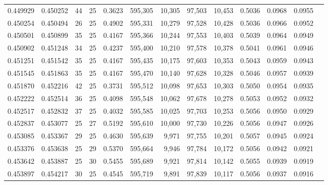 \begin{tabular}{rrrrrrrrrrrrr}
0.449929 & 0.450252 &    44 &  25 &                                     0.3623 & 595,305 &  10,305 &  97,503 &  10,453 & 0.5036 & 0.0968 & 0.0955 \\
0.450254 & 0.450494 &    26 &  25 &                                     0.4902 & 595,331 &  10,279 &  97,528 &  10,428 & 0.5036 & 0.0966 & 0.0952 \\
0.450501 & 0.450899 &    35 &  25 &                                     0.4167 & 595,366 &  10,244 &  97,553 &  10,403 & 0.5039 & 0.0964 & 0.0949 \\
0.450902 & 0.451248 &    34 &  25 &                                     0.4237 & 595,400 &  10,210 &  97,578 &  10,378 & 0.5041 & 0.0961 & 0.0946 \\
0.451251 & 0.451542 &    35 &  25 &                                     0.4167 & 595,435 &  10,175 &  97,603 &  10,353 & 0.5043 & 0.0959 & 0.0943 \\
0.451545 & 0.451863 &    35 &  25 &                                     0.4167 & 595,470 &  10,140 &  97,628 &  10,328 & 0.5046 & 0.0957 & 0.0939 \\
0.451870 & 0.452216 &    42 &  25 &                                     0.3731 & 595,512 &  10,098 &  97,653 &  10,303 & 0.5050 & 0.0954 & 0.0935 \\
0.452222 & 0.452514 &    36 &  25 &                                     0.4098 & 595,548 &  10,062 &  97,678 &  10,278 & 0.5053 & 0.0952 & 0.0932 \\
0.452517 & 0.452832 &    37 &  25 &                                     0.4032 & 595,585 &  10,025 &  97,703 &  10,253 & 0.5056 & 0.0950 & 0.0929 \\
0.452837 & 0.453077 &    25 &  27 &                                     0.5192 & 595,610 &  10,000 &  97,730 &  10,226 & 0.5056 & 0.0947 & 0.0926 \\
0.453085 & 0.453367 &    29 &  25 &                                     0.4630 & 595,639 &   9,971 &  97,755 &  10,201 & 0.5057 & 0.0945 & 0.0924 \\
0.453376 & 0.453638 &    25 &  29 &                                     0.5370 & 595,664 &   9,946 &  97,784 &  10,172 & 0.5056 & 0.0942 & 0.0921 \\
0.453642 & 0.453887 &    25 &  30 &                                     0.5455 & 595,689 &   9,921 &  97,814 &  10,142 & 0.5055 & 0.0939 & 0.0919 \\
0.453897 & 0.454217 &    30 &  25 &                                     0.4545 & 595,719 &   9,891 &  97,839 &  10,117 & 0.5056 & 0.0937 & 0.0916 \\

\end{tabular}
